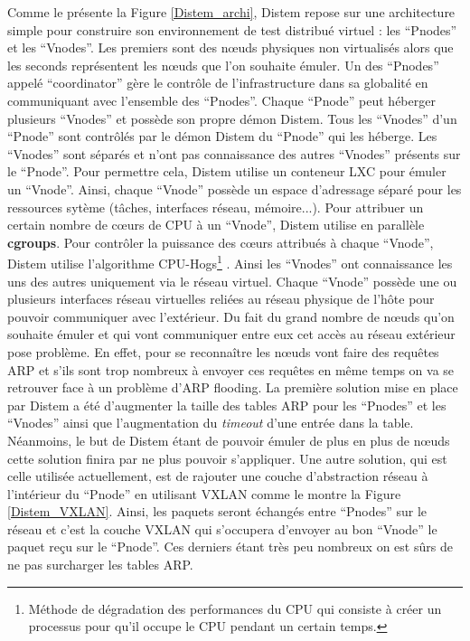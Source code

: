 Comme le présente la Figure \ref{Distem_archi}, Distem repose sur une
architecture simple pour construire son environnement de test distribué virtuel
: les ``Pnodes'' et les ``Vnodes''. Les premiers sont des n\oe uds physiques non
virtualisés alors que les seconds représentent les n\oe uds que l'on souhaite
émuler. Un des ``Pnodes'' appelé ``coordinator'' gère le contrôle de
l'infrastructure dans sa globalité en communiquant avec l'ensemble des
``Pnodes''. Chaque ``Pnode'' peut héberger plusieurs ``Vnodes'' et possède son
propre démon Distem. Tous les ``Vnodes'' d'un ``Pnode'' sont contrôlés par le
démon Distem du ``Pnode'' qui les héberge. Les ``Vnodes'' sont séparés et n'ont
pas connaissance des autres ``Vnodes'' présents sur le ``Pnode''. Pour permettre
cela, Distem utilise un conteneur LXC pour émuler un ``Vnode''. Ainsi, chaque
``Vnode'' possède un espace d'adressage séparé pour les ressources sytème
(tâches, interfaces réseau, mémoire...). Pour attribuer un certain nombre de
c\oe urs de CPU à un ``Vnode'', Distem utilise en parallèle \textbf{cgroups}. Pour contrôler la puissance des c\oe urs attribués à chaque
``Vnode'', Distem utilise l'algorithme CPU-Hogs\footnote{Méthode de dégradation
  des performances du CPU qui consiste à créer un processus pour qu'il occupe le
  CPU pendant un certain temps.} \citep{DISTEM_buchert2011methods}. Ainsi les
``Vnodes'' ont connaissance les uns des autres uniquement via le réseau
virtuel. Chaque ``Vnode'' possède une ou plusieurs interfaces réseau virtuelles
reliées au réseau physique de l'hôte pour pouvoir communiquer avec
l'extérieur. Du fait du grand nombre de n\oe uds qu'on souhaite émuler et qui
vont communiquer entre eux cet accès au réseau extérieur pose problème. En
effet, pour se reconnaître les n\oe uds vont faire des requêtes ARP et s'ils
sont trop nombreux à envoyer ces requêtes en même temps on va se retrouver face
à un problème d'ARP flooding. La première solution mise en place par Distem a
été d'augmenter la taille des tables ARP pour les ``Pnodes'' et les ``Vnodes''
ainsi que l'augmentation du \textit{timeout} d'une entrée dans la
table. Néanmoins, le but de Distem étant de pouvoir émuler de plus en plus de
n\oe uds cette solution finira par ne plus pouvoir s'appliquer. Une autre
solution, qui est celle utilisée actuellement, est de rajouter une couche
d'abstraction réseau à l'intérieur du ``Pnode'' en utilisant
VXLAN \citep{VXLAN_mahalingam2014virtual, DISTEM_buchert2014emulation} comme le
montre la Figure \ref{Distem_VXLAN}. Ainsi, les paquets seront échangés entre
``Pnodes'' sur le réseau et c'est la couche VXLAN qui s'occupera d'envoyer au
bon ``Vnode'' le paquet reçu sur le ``Pnode''. Ces derniers étant très peu
nombreux on est sûrs de ne pas surcharger les tables ARP.

